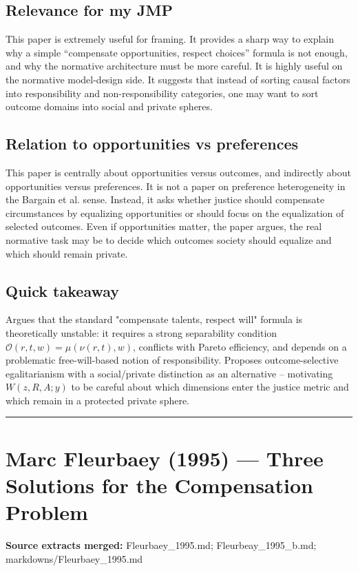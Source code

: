 \documentclass[11pt,a4paper]{article}
\begin{document}
\subsection*{Relevance for my JMP}
This paper is extremely useful for framing. It provides a sharp way to explain why a simple “compensate opportunities, respect choices” formula is not enough, and why the normative architecture must be more careful. It is highly useful on the normative model-design side. It suggests that instead of sorting causal factors into responsibility and non-responsibility categories, one may want to sort outcome domains into social and private spheres.

\subsection*{Relation to opportunities vs preferences}
This paper is centrally about opportunities versus outcomes, and indirectly about opportunities versus preferences. It is not a paper on preference heterogeneity in the Bargain et al. sense. Instead, it asks whether justice should compensate circumstances by equalizing opportunities or should focus on the equalization of selected outcomes. Even if opportunities matter, the paper argues, the real normative task may be to decide which outcomes society should equalize and which should remain private.

\subsection*{Quick takeaway}
Argues that the standard "compensate talents, respect will" formula is theoretically unstable: it requires a strong separability condition $\mathcal{O}(r,t,w) = \mu(\nu(r,t),w)$, conflicts with Pareto efficiency, and depends on a problematic free-will-based notion of responsibility. Proposes outcome-selective egalitarianism with a social/private distinction as an alternative -- motivating $W(z,R,A;y)$ to be careful about which dimensions enter the justice metric and which remain in a protected private sphere.


\medskip\hrule\medskip

\section*{Marc Fleurbaey (1995) — Three Solutions for the Compensation Problem}

\textbf{Source extracts merged:} Fleurbaey\_1995.md; Fleurbeay\_1995\_b.md; markdowns/Fleurbaey\_1995.md
\end{document}
